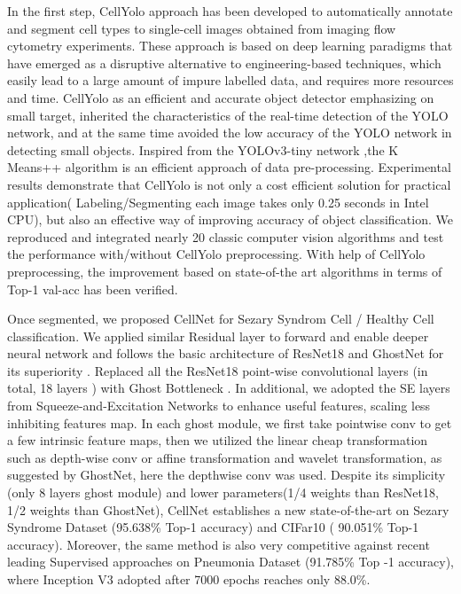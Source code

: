 In the first step, CellYolo approach has been developed to automatically annotate and segment cell types to single-cell images obtained from imaging flow cytometry experiments. These approach is based on deep learning paradigms that have emerged as a disruptive alternative to engineering-based techniques, which easily lead to a large amount of impure labelled data, and requires more resources and time. CellYolo as an efficient and accurate object detector emphasizing on small target, inherited the characteristics of the real-time detection of the YOLO network\cite{b33}, and at the same time avoided the low accuracy of the YOLO network in detecting small objects. Inspired from the YOLOv3-tiny network ,the K Means++ algorithm is an efficient approach of data pre-processing\cite{b18}. Experimental results demonstrate that CellYolo is not only a cost efficient solution for practical application( Labeling/Segmenting each image takes only 0.25 seconds in Intel CPU), but also an effective way of improving accuracy of object classification. We reproduced and integrated nearly 20 classic computer vision algorithms and test the performance with/without CellYolo preprocessing. With help of CellYolo preprocessing, the improvement based on state-of-the art algorithms in terms of Top-1 val-acc has been verified.

Once segmented, we proposed CellNet for Sezary Syndrom Cell / Healthy Cell classification. We applied similar Residual layer to forward and enable deeper neural network and follows the basic architecture of ResNet18 and GhostNet for its superiority \cite{b19}\cite{b20}. Replaced all the ResNet18 \cite{b20} point-wise convolutional layers (in total, 18 layers ) with Ghost Bottleneck \cite{b19}. In additional, we adopted the SE layers from Squeeze-and-Excitation Networks \cite{b24} to enhance useful features, scaling less inhibiting features map. In each ghost module, we first take pointwise conv to get a few intrinsic feature maps, then we utilized the linear cheap transformation such as depth-wise conv or affine transformation and wavelet transformation, as suggested by GhostNet\cite{b19}, here the depthwise conv was used.
Despite its simplicity (only 8 layers ghost module) and lower parameters(1/4 weights than ResNet18\cite{b20}, 1/2 weights than GhostNet\cite{b19}), CellNet establishes a new state-of-the-art on Sezary Syndrome Dataset (95.638\% Top-1 accuracy) and CIFar10 ( 90.051\% Top-1 accuracy)\cite{b21}. Moreover, the same method is also very competitive against recent leading Supervised approaches on Pneumonia Dataset (91.785\% Top -1 accuracy), where Inception V3 adopted after 7000 epochs reaches only 88.0\%\cite{b38}.

